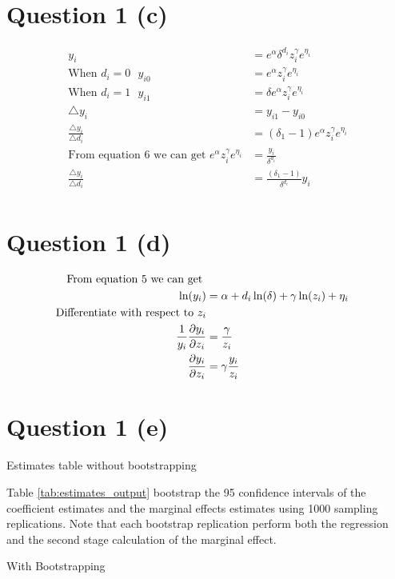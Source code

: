 \documentclass{article}
\begin{document}
\section{Question 1 (c)}
\begin{align}
    y_i &= e^{\alpha}{\delta}^{d_i} z_i^{\gamma} e^{\eta_i}\\
    \text{When } {d_i}=0 \text{   } y_{i0} &= e^{\alpha} z_i^{\gamma} e^{\eta_i}\\
    \text{When } {d_i}=1 \text{   } y_{i1} &= {\delta} e^{\alpha}  z_i^{\gamma} e^{\eta_i}\\
    \bigtriangleup  y_i &= y_{i1} - y_{i0} \\
    \frac{\bigtriangleup  y_i}{\bigtriangleup  d_i} &= ({\delta} _1 - 1) e^{\alpha} z_i^{\gamma} e^{\eta_i}\\
    \text{From equation 6 we can get } e^{\alpha} z_i^{\gamma} e^{\eta_i} &= \frac{y_i}{{\delta}^{d_i}}\\
     \frac{\bigtriangleup  y_i}{\bigtriangleup  d_i} &= \frac{({\delta} _1 - 1)}{{\delta}^{d_i}}  y_i \\
\end{align}

\section{Question 1 (d)}
\begin{align}
    \text{From equation 5 we can get } \notag\\
    \ln(y_i) &= {\alpha} + {d_i} \ln({\delta}) + {\gamma}\ln(z_i) +  {\eta_i} \\
    \text{Differentiate with respect to } z_i \notag \\
    \frac{1}{y_i} \frac{\partial y_i}{\partial z_i} &= \frac{{\gamma}}{z_i}\\
  \frac{\partial y_i}{\partial z_i} &={\gamma} \frac{y_i}{z_i} \\
\end{align}

\section{Question 1 (e)}

\begin{table}[ht]
    \centering
    
    \caption{Estimates table without bootstrapping}
    \label{tab:my_label}
\end{table}

Table \ref{tab:estimates_output} bootstrap the 95\text{\%} confidence intervals of the coefficient estimates and the marginal effects estimates using 1000 sampling replications. Note that each bootstrap replication perform both the regression and the second stage calculation of the marginal effect.
\begin{table}[ht]
    \centering
    
    \caption{With Bootstrapping}
    \label{tab:estimates_output}
\end{table}
\end{document}

